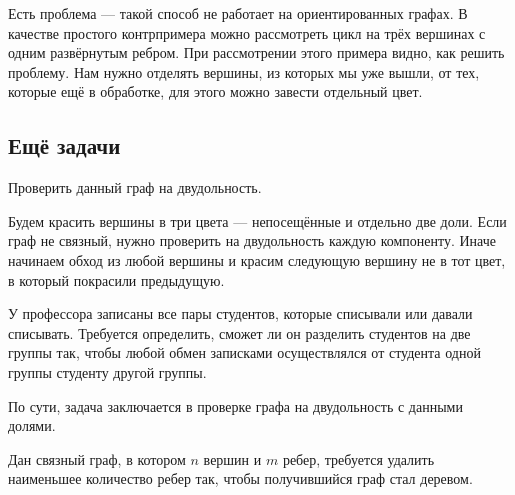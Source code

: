 Есть проблема --- такой способ не работает на ориентированных графах. В качестве простого контрпримера можно рассмотреть цикл на трёх вершинах с одним развёрнутым ребром. При рассмотрении этого примера видно, как решить проблему. Нам нужно отделять вершины, из которых мы уже вышли, от тех, которые ещё в обработке, для этого можно завести отдельный цвет.

\subsection{Ещё задачи}

\begin{problem}
    Проверить данный граф на двудольность.
\end{problem}

Будем красить вершины в три цвета --- непосещённые и отдельно две доли. Если граф не связный, нужно проверить на двудольность каждую компоненту. Иначе начинаем обход из любой вершины и красим следующую вершину не в тот цвет, в который покрасили предыдущую.

\begin{problem}
    У профессора записаны все пары студентов, которые списывали или давали списывать. Требуется определить, сможет ли он разделить студентов на две группы так, чтобы любой обмен записками осуществлялся от студента одной группы студенту другой группы.
\end{problem}

По сути, задача заключается в проверке графа на двудольность с данными долями. 

\begin{problem}
    Дан связный граф, в котором $n$ вершин и $m$ ребер, требуется удалить наименьшее количество ребер так, чтобы получившийся граф стал деревом.
\end{problem}
